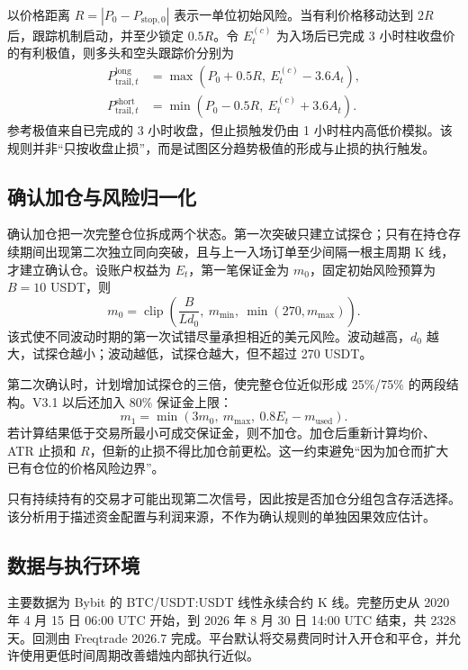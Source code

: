 以价格距离 $R=|P_0-P_{\mathrm{stop},0}|$ 表示一单位初始风险。当有利价格移动达到 $2R$ 后，跟踪机制启动，并至少锁定 $0.5R$。令 $E_t^{(c)}$ 为入场后已完成 3 小时柱收盘价的有利极值，则多头和空头跟踪价分别为
\begin{align}
  P_{\mathrm{trail},t}^{\mathrm{long}}
  &=\max\left(P_0+0.5R,\ E_t^{(c)}-3.6A_t\right),\\
  P_{\mathrm{trail},t}^{\mathrm{short}}
  &=\min\left(P_0-0.5R,\ E_t^{(c)}+3.6A_t\right).
  \label{eq:trail}
\end{align}
参考极值来自已完成的 3 小时收盘，但止损触发仍由 1 小时柱内高低价模拟。该规则并非“只按收盘止损”，而是试图区分趋势极值的形成与止损的执行触发。

\subsection{确认加仓与风险归一化}

确认加仓把一次完整仓位拆成两个状态。第一次突破只建立试探仓；只有在持仓存续期间出现第二次独立同向突破，且与上一入场订单至少间隔一根主周期 K 线，才建立确认仓。设账户权益为 $E_t$，第一笔保证金为 $m_0$，固定初始风险预算为 $B=10$ USDT，则
\begin{equation}
  m_0=\operatorname{clip}\left(
     \frac{B}{Ld_0},\ m_{\min},\ \min(270,m_{\max})
  \right).
  \label{eq:scout-stake}
\end{equation}
该式使不同波动时期的第一次试错尽量承担相近的美元风险。波动越高，$d_0$ 越大，试探仓越小；波动越低，试探仓越大，但不超过 270 USDT。

第二次确认时，计划增加试探仓的三倍，使完整仓位近似形成 25\%/75\% 的两段结构。V3.1 以后还加入 80\% 保证金上限：
\begin{equation}
  m_1=\min\left(3m_0,\ m_{\max},\ 0.8E_t-m_{\mathrm{used}}\right).
  \label{eq:add-stake}
\end{equation}
若计算结果低于交易所最小可成交保证金，则不加仓。加仓后重新计算均价、ATR 止损和 $R$，但新的止损不得比加仓前更松。这一约束避免“因为加仓而扩大已有仓位的价格风险边界”。

只有持续持有的交易才可能出现第二次信号，因此按是否加仓分组包含存活选择。该分析用于描述资金配置与利润来源，不作为确认规则的单独因果效应估计。

\subsection{数据与执行环境}

主要数据为 Bybit 的 BTC/USDT:USDT 线性永续合约 K 线。完整历史从 2020 年 4 月 15 日 06:00 UTC 开始，到 2026 年 8 月 30 日 14:00 UTC 结束，共 2328 天。回测由 Freqtrade 2026.7 完成。平台默认将交易费同时计入开仓和平仓，并允许使用更低时间周期改善蜡烛内部执行近似\cite{freqtrade_backtesting}。

